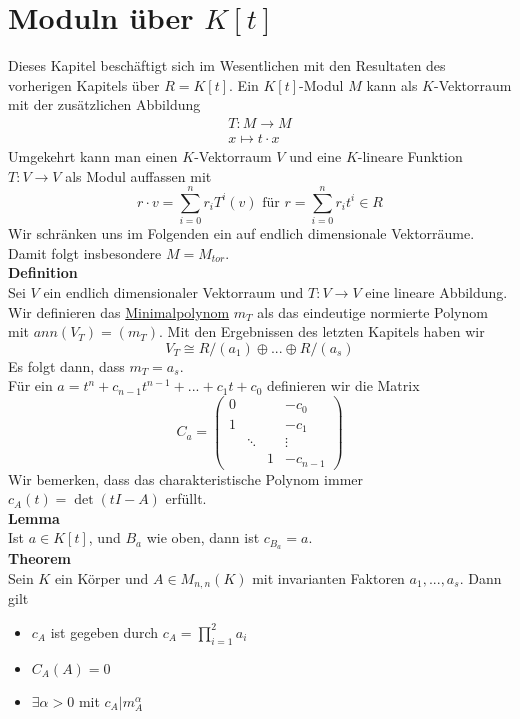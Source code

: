 \documentclass[a4paper, 12pt]{article}
\begin{document}
\section{Moduln über $K[t]$}
Dieses Kapitel beschäftigt sich im Wesentlichen mit den Resultaten des vorherigen Kapitels über $R = K[t]$. Ein $K[t]$-Modul $M$ kann als $K$-Vektorraum mit der zusätzlichen Abbildung \begin{align*}
	T: M \to M\\
	x \mapsto t\cdot x
\end{align*}
Umgekehrt kann man einen $K$-Vektorraum $V$ und eine $K$-lineare Funktion $T: V \to V$ als Modul auffassen mit \[r\cdot v = \sum_{i=0}^n r_i T^i(v) \text{ für } r = \sum_{i=0}^n r_i t^i \in R\]
Wir schränken uns im Folgenden ein auf endlich dimensionale Vektorräume. Damit folgt insbesondere $M = M_{tor}$.\\
\textbf{Definition}\\
Sei $V$ ein endlich dimensionaler Vektorraum und $T: V \to V$ eine lineare Abbildung. Wir definieren das \underline{Minimalpolynom} $m_T$ als das eindeutige normierte Polynom mit $ann(V_T) = (m_T)$. Mit den Ergebnissen des letzten Kapitels haben wir \[V_T \cong R/(a_1) \oplus ... \oplus R/(a_s)\]
Es folgt dann, dass $m_T = a_s$.\\
Für ein $a = t^n + c_{n-1} t^{n-1} + ... + c_1 t + c_0$ definieren wir die Matrix \[C_a = \begin{pmatrix}
	0 & & & -c_0\\
	1 & & & -c_1\\
	  & \ddots & & \vdots\\
	  & & 1 & -c_{n-1}
\end{pmatrix}\]
Wir bemerken, dass das charakteristische Polynom immer $c_A(t) = \det(tI-A)$ erfüllt.\\
\textbf{Lemma}\\
Ist $a \in K[t]$, und $B_a$ wie oben, dann ist $c_{B_a} = a$.\\
\textbf{Theorem}\\
Sein $K$ ein Körper und $A \in M_{n,n}(K)$ mit invarianten Faktoren $a_1,...,a_s$. Dann gilt \begin{itemize}
	\item $c_A$ ist gegeben durch $c_A = \prod_{i=1}^{2} a_i$
	\item $C_A(A) = 0$
	\item $\exists \alpha > 0$ mit $c_A | m_A^\alpha$
\end{itemize}
\end{document}
